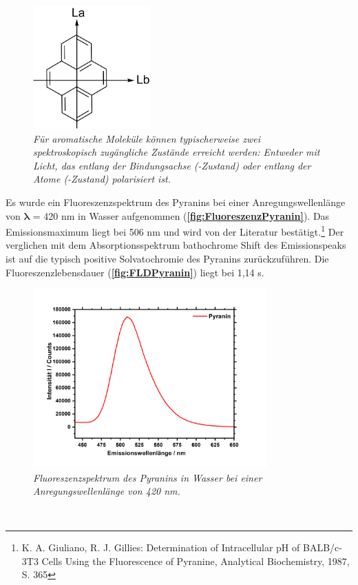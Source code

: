 \documentclass[12pt,a4paper]{report}
\begin{document}
			\begin{figure}[h!]
				\centering
				\includegraphics*[width=0.4\textwidth]{LaLb.png}
				\caption{\textnormal{\textit{Für aromatische Moleküle können typischerweise zwei spektroskopisch zugängliche Zustände erreicht werden: Entweder mit Licht, das entlang der Bindungsachse (-Zustand) oder entlang der Atome (-Zustand) polarisiert ist.}}}
				\label{fig:LaLb}
			\end{figure}
	\noindent Es wurde ein Fluoreszenzspektrum des Pyranins bei einer Anregungswellenlänge von $\mathbf{\lambda}$\textbf{} = 420 nm in Wasser aufgenommen (\textbf{\autoref{fig:FluoreszenzPyranin}}). Das Emissionsmaximum liegt bei 506 nm und wird von der Literatur bestätigt.\footnote{K. A. Giuliano, R. J. Gillies: Determination of Intracellular pH of BALB/c-3T3 Cells Using the Fluorescence of Pyranine, Analytical Biochemistry, 1987, S. 365} Der verglichen mit dem Absorptionsspektrum bathochrome Shift des Emissionspeaks ist auf die typisch positive Solvatochromie des Pyranins zurückzuführen. Die Fluoreszenzlebensdauer (\textbf{\autoref{fig:FLDPyranin}}) liegt bei 1,14 s. \\
			\begin{figure}[h!]
				\centering
				\includegraphics*[width=0.8\textwidth]{FluoreszenzPyranin.jpg}
				\caption{\textnormal{\textit{Fluoreszenzspektrum des Pyranins in Wasser bei einer Anregungswellenlänge von 420 nm.}}}
				\label{fig:FluoreszenzPyranin}
			\end{figure}\\
\end{document}
